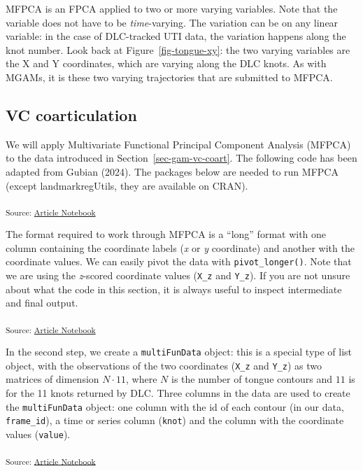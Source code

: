 \documentclass[
]{interact}
\begin{document}
MFPCA is an FPCA applied to two or more varying variables. Note that the
variable does not have to be \emph{time}-varying. The variation can be
on any linear variable: in the case of DLC-tracked UTI data, the
variation happens along the knot number. Look back at
Figure~\ref{fig-tongue-xy}: the two varying variables are the X and Y
coordinates, which are varying along the DLC knots. As with MGAMs, it is
these two varying trajectories that are submitted to MFPCA.

\subsection{VC coarticulation}\label{vc-coarticulation}

We will apply Multivariate Functional Principal Component Analysis
(MFPCA) to the data introduced in Section~\ref{sec-gam-vc-coart}. The
following code has been adapted from Gubian (2024). The packages below
are needed to run MFPCA (except landmarkregUtils, they are available on
CRAN).

\textsubscript{Source:
\href{https://stefanocoretta.github.io/mv_uti/index.qmd.html}{Article
Notebook}}

The format required to work through MFPCA is a ``long'' format with one
column containing the coordinate labels (\emph{x} or \emph{y}
coordinate) and another with the coordinate values. We can easily pivot
the data with \texttt{pivot\_longer()}. Note that we are using the
\emph{z}-scored coordinate values (\texttt{X\_z} and \texttt{Y\_z}). If
you are not unsure about what the code in this section, it is always
useful to inspect intermediate and final output.

\textsubscript{Source:
\href{https://stefanocoretta.github.io/mv_uti/index.qmd.html}{Article
Notebook}}

In the second step, we create a \texttt{multiFunData} object: this is a
special type of list object, with the observations of the two
coordinates (\texttt{X\_z} and \texttt{Y\_z}) as two matrices of
dimension \(N \cdot 11\), where \(N\) is the number of tongue contours
and \(11\) is for the 11 knots returned by DLC. Three columns in the
data are used to create the \texttt{multiFunData} object: one column
with the id of each contour (in our data, \texttt{frame\_id}), a time or
series column (\texttt{knot}) and the column with the coordinate values
(\texttt{value}).

\textsubscript{Source:
\href{https://stefanocoretta.github.io/mv_uti/index.qmd.html}{Article
Notebook}}
\end{document}
